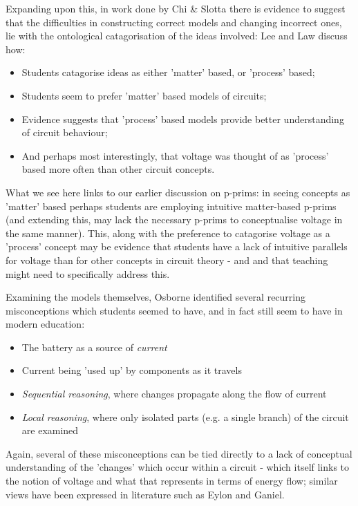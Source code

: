 \documentclass[a4paper,openany,nobib]{tufte-book}
\begin{document}
Expanding upon this, in work done by Chi \& Slotta\autocite{slotta} there is evidence to suggest that the difficulties in constructing correct models and changing incorrect ones, lie with the ontological catagorisation of the ideas involved: Lee and Law\autocite{lee2001} discuss how:
\begin{itemize}
	\item Students catagorise ideas as either 'matter' based, or 'process' based;
	\item Students seem to prefer 'matter' based models of circuits;
	\item Evidence suggests that 'process' based models provide better understanding of circuit behaviour;
	\item And perhaps most interestingly, that voltage was thought of as 'process' based more often than other circuit concepts.
\end{itemize}
What we see here links to our earlier discussion on p-prims:
in seeing concepts as 'matter' based perhaps students are employing intuitive matter-based p-prims (and extending this, may lack the necessary p-prims to conceptualise voltage in the same manner). This, along with the preference to catagorise voltage as a 'process' concept may be evidence that students have a lack of intuitive parallels for voltage than for other concepts in circuit theory - and and that teaching might need to specifically address this.

Examining the models themselves, Osborne\autocite{osb} identified several recurring misconceptions which students seemed to have, and in fact still seem to {have in modern education\autocite{suryadi2020}}:
\begin{itemize}
	\item The battery as a source of \emph{current} 
	\item Current being 'used up' by components as it travels
	\item \emph{Sequential reasoning}, where changes propagate along the flow of current
	\item \emph{Local reasoning}, where only isolated parts (e.g. a single branch) of the circuit are examined
\end{itemize}
Again, several of these misconceptions can be tied directly to a lack of conceptual understanding of the 'changes' which occur within a circuit - which itself links to the notion of voltage and what that represents in terms of energy flow; similar views have been expressed in literature such as Eylon and {Ganiel\autocite{eylon1990}}.
\end{document}
